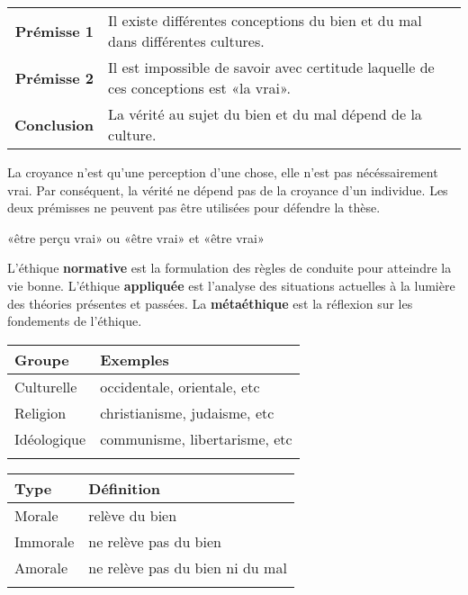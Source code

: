 \documentclass[11pt]{article}
\begin{document}
\begin{center}
\begin{tabularx}{\textwidth}{@{}r|X@{}}
  \textbf{Prémisse 1}
& Il existe différentes conceptions du bien et du mal dans différentes cultures.\\
  \textbf{Prémisse 2}
& Il est impossible de savoir avec certitude laquelle de ces conceptions est «la vrai».\\
  \textbf{Conclusion}
& La vérité au sujet du bien et du mal dépend de la culture.\\
\end{tabularx}
\end{center}
La croyance n'est qu'une perception d'une chose, elle n'est pas nécéssairement vrai. Par conséquent, la vérité ne dépend pas de la croyance d'un individue. Les deux prémisses ne peuvent pas être utilisées pour défendre la thèse.
\begin{center}
«être perçu vrai» ou «être vrai» et «être vrai»
\end{center}


L'éthique \textbf{normative} est la formulation des règles de conduite pour atteindre la vie bonne. L'éthique \textbf{appliquée} est l'analyse des situations actuelles à la lumière des théories présentes et passées. La \textbf{métaéthique} est la réflexion sur les fondements de l'éthique.


\begin{center}
\begin{tabular}{@{}ll@{}}
\hline
  \textbf{Groupe}
& \textbf{Exemples}\\
\hline
  Culturelle
& occidentale, orientale, etc\\
  Religion
& christianisme, judaisme, etc\\
  Idéologique
& communisme, libertarisme, etc\\
\hline\\
\end{tabular}
\end{center}

\begin{center}
\begin{tabular}{@{}ll@{}}
\hline
  \textbf{Type}
& \textbf{Définition}\\
\hline
  Morale
& relève du bien\\
  Immorale
& ne relève pas du bien\\
  Amorale
& ne relève pas du bien ni du mal\\
\hline\\
\end{tabular}
\end{center}
\end{document}
